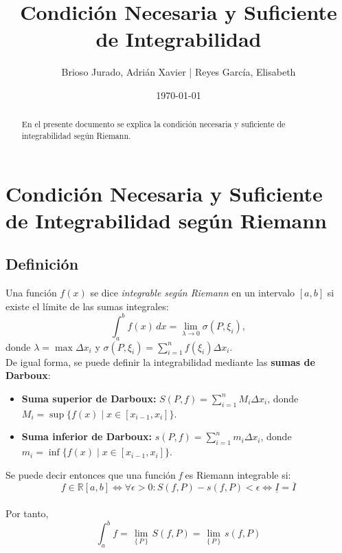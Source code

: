 \documentclass{article}
\title{Condición Necesaria y Suficiente de Integrabilidad}
\author{Brioso Jurado, Adrián Xavier | Reyes García, Elisabeth}
\date{\today}
\begin{document}
\maketitle

\begin{abstract}
En el presente documento se explica la condición necesaria y suficiente de integrabilidad según Riemann.
\end{abstract}

\section{Condición Necesaria y Suficiente de Integrabilidad según Riemann}

\subsection{Definición}
Una función \(f(x)\) se dice \textit{integrable según Riemann} en un intervalo \([a,b]\) si existe el límite de las sumas integrales:
\[
\int_{a}^{b} f(x) \, dx = \lim_{\lambda \to 0} \sigma(P, \xi_i),
\]
donde \( \lambda = \max \Delta x_i \) y \( \sigma(P, \xi_i) = \sum_{i=1}^{n} f(\xi_i) \Delta x_i \).\\

De igual forma, se puede definir la integrabilidad mediante las \textbf{sumas de Darboux}:
\begin{itemize}
    \item \textbf{Suma superior de Darboux:} \( S(P, f) = \sum_{i=1}^{n} M_i \Delta x_i \), donde \( M_i = \sup \{f(x) \mid x \in [x_{i-1}, x_i]\} \).
    \item \textbf{Suma inferior de Darboux:} \( s(P, f) = \sum_{i=1}^{n} m_i \Delta x_i \), donde \( m_i = \inf \{f(x) \mid x \in [x_{i-1}, x_i]\} \).
\end{itemize}
Se puede decir entonces que una función \textit{f} es Riemann integrable si:
\[
f \in \mathbb{R}[a,b] \iff \forall \epsilon>0: S(f,P) - s(f,P)< \epsilon \iff \underline{I} = \overline{I}
\]\\

Por tanto,
\[
\int_a^b f = \lim_{\left\{ P \right\}} S(f,P) = \lim_{\left\{ P \right\}} s(f,P)
\]
\end{document}
